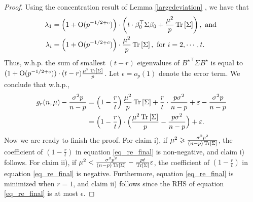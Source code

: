 \begin{proof}
    Using the concentration result of Lemma \ref{largedeviation} , we have that
    \begin{align*}
        \lambda_1 &= \Big(1+\OO(p^{-1/2+c})\Big)\cdot\left(t\cdot \beta_0^\top \Sigma \beta_0  + \frac{\mu^2}{ p}\bigtr{\Sigma}\right) , \text{ and } \\
        \lambda_i &= \Big(1+\OO(p^{-1/2+c})\Big)\cdot \frac{\mu^2}{ p}\bigtr{\Sigma}, \text{ for } i=2,\cdots, t.
    \end{align*}
    Thus, w.h.p. the sum of smallest $(t - r)$ eigenvalues of ${B^{\star}}^{\top}\Sigma  B^{\star}$ is equal to
    $(1+\operatorname{O}(p^{-1/2+c}))\cdot(t-r)\frac{\mu^2 \operatorname{Tr}\left[\Sigma\right]}{p}$.
    Let $\epsilon = o_p(1)$ denote the error term.
    We conclude that w.h.p.,
    \begin{align}
        g_r(n, \mu) - \frac{\sigma^2 p}{n - p} &= \bigbrace{1 - \frac{r}{t}} \frac{\mu^2}{p}\bigtr{\Sigma} + \frac{r}{t} \cdot \frac{p\sigma^2 }{n - p} + \epsilon - \frac{\sigma^2 p}{n - p} \nonumber \\
        &= \Big(1 - \frac r t\Big) \cdot \Big(\frac{\mu^2\bigtr{\Sigma}}{p} - \frac{p\sigma^2}{n - p}\Big) + \epsilon. \label{eq_re_final}
    \end{align}
    Now we are ready to finish the proof.
    For claim i), if $\mu^2 \geqslant \frac{\sigma^2 p^2}{(n - p) \operatorname{Tr}\left[\Sigma\right]}$, the coefficient of $(1 - \frac r t)$ in equation \eqref{eq_re_final} is non-negative, and claim i) follows.
    For claim ii), if $\mu^2 < \frac{\sigma^2 p^2}{(n - p)\operatorname{Tr}\left[\Sigma\right]} - \frac{p t}{\operatorname{Tr}\left[\Sigma\right]}\varepsilon$, the coefficient of $(1 - \frac r t)$ in equation \eqref{eq_re_final} is negative.
    Furthermore, equation \eqref{eq_re_final} is minimized when $r = 1$, and claim ii) follows since the RHS of equation \eqref{eq_re_final} is at most $\epsilon$.
\end{proof}

